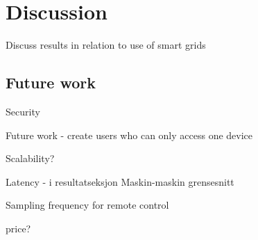 \chapter{Discussion}

Discuss results in relation to use of smart grids 

\section{Future work}

Security


Future work - create users who can only access one device 

Scalability? 

Latency - i resultatseksjon
Maskin-maskin grensesnitt

Sampling frequency for remote control

price?
